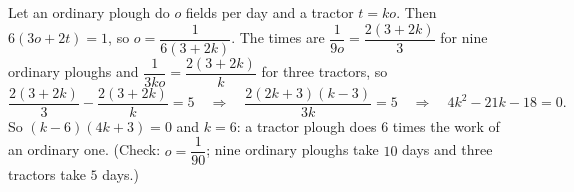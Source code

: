 Let an ordinary plough do $o$ fields per day and a tractor $t=ko$. Then $6(3o+2t)=1$, so $o=\dfrac{1}{6(3+2k)}$. The times are $\dfrac{1}{9o}=\dfrac{2(3+2k)}{3}$ for nine ordinary ploughs and $\dfrac{1}{3ko}=\dfrac{2(3+2k)}{k}$ for three tractors, so
\[
\dfrac{2(3+2k)}{3}-\dfrac{2(3+2k)}{k}=5\quad\Longrightarrow\quad\dfrac{2(2k+3)(k-3)}{3k}=5\quad\Longrightarrow\quad4k^2-21k-18=0 .
\]
So $(k-6)(4k+3)=0$ and $k=\boxed{6}$: a tractor plough does $6$ times the work of an ordinary one. (Check: $o=\dfrac{1}{90}$; nine ordinary ploughs take $10$ days and three tractors take $5$ days.)
